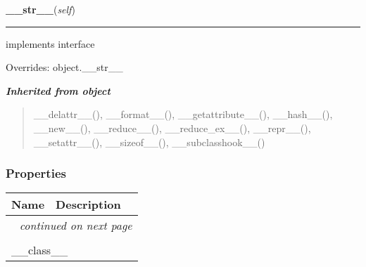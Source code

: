     \vspace{0.5ex}

\hspace{.8\funcindent}\begin{boxedminipage}{\funcwidth}

    \raggedright \textbf{\_\_str\_\_}(\textit{self})

    \vspace{-1.5ex}

    \rule{\textwidth}{0.5\fboxrule}
\setlength{\parskip}{2ex}
    implements interface

\setlength{\parskip}{1ex}
      Overrides: object.\_\_str\_\_

    \end{boxedminipage}


\large{\textbf{\textit{Inherited from object}}}

\begin{quote}
\_\_delattr\_\_(), \_\_format\_\_(), \_\_getattribute\_\_(), \_\_hash\_\_(), \_\_new\_\_(), \_\_reduce\_\_(), \_\_reduce\_ex\_\_(), \_\_repr\_\_(), \_\_setattr\_\_(), \_\_sizeof\_\_(), \_\_subclasshook\_\_()
\end{quote}


  \subsubsection{Properties}

    \vspace{-1cm}
\hspace{\varindent}\begin{longtable}{|p{\varnamewidth}|p{\vardescrwidth}|l}
\cline{1-2}
\cline{1-2} \centering \textbf{Name} & \centering \textbf{Description}& \\
\cline{1-2}
\endhead\cline{1-2}\multicolumn{3}{r}{\small\textit{continued on next page}}\\\endfoot\cline{1-2}
\endlastfoot\multicolumn{2}{|l|}{\textit{Inherited from object}}\\
\multicolumn{2}{|p{\varwidth}|}{\raggedright \_\_class\_\_}\\
\cline{1-2}
\end{longtable}


